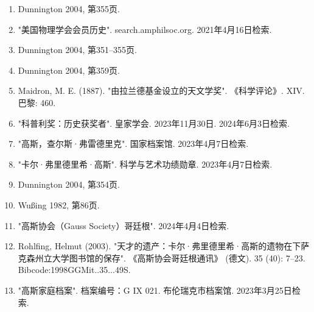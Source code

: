 \begin{enumerate}
\item Dunnington 2004, 第355页.  
\item "美国物理学会会员历史". search.amphilsoc.org. 2021年4月16日检索.  
\item Dunnington 2004, 第351–355页.  
\item Dunnington 2004, 第359页.  
\item Maidron, M. E. (1887). "由拉兰德基金设立的天文学奖". 《科学评论》. XIV. 巴黎: 460.  
\item "科普利奖：历史获奖者". 皇家学会. 2023年11月30日. 2024年6月3日检索.  
\item "高斯，查尔斯·弗雷德里克". 国家档案馆. 2023年4月7日检索.  
\item "卡尔·弗里德里希·高斯". 科学与艺术功绩勋章. 2023年4月7日检索.  
\item Dunnington 2004, 第354页.  
\item Wußing 1982, 第86页.  
\item "高斯协会（Gauss Society）哥廷根". 2024年4月4日检索.  
\item Rohlfing, Helmut (2003). "天才的遗产：卡尔·弗里德里希·高斯的遗物在下萨克森州立大学图书馆的保存". 《高斯协会哥廷根通讯》 (德文). 35 (40): 7–23. Bibcode:1998GGMit..35...49S.  
\item "高斯家庭档案". 档案编号：G IX 021. 布伦瑞克市档案馆. 2023年3月25日检索.
\end{enumerate}